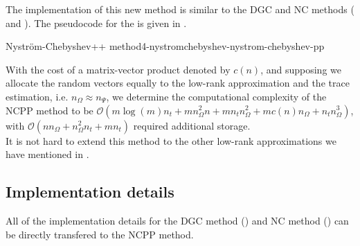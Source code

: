 The implementation of this new method is similar to the \gls{DGC} and \gls{NC} methods ( and ).
The pseudocode for the  is given in .

\begin{algo}{Nystr\"om-Chebyshev++ method}{4-nystromchebyshev-nystrom-chebyshev-pp}
    
\end{algo}

With the cost of a matrix-vector product denoted by
$c(n)$, and supposing we allocate the random vectors equally
to the low-rank approximation and the trace estimation, i.e. $n_{\Omega} \approx n_{\Psi}$,
we determine the computational complexity of the \gls{NCPP}
method to be $\mathcal{O}(m \log(m) n_t + m n_{\Omega}^2 n + m n_t n_{\Omega}^2 +  m c(n) n_{\Omega} + n_t n_{\Omega}^3)$, with
$\mathcal{O}(n n_{\Omega} + n_{\Omega}^2 n_t + m n_t)$ required additional storage.\\

It is not hard to extend this method to the other low-rank approximations
we have mentioned in .


\subsection{Implementation details}
\label{subsec:4-nystromchebyshev-implementation-details}

All of the implementation details for the \gls{DGC} method ()
and \gls{NC} method ()
can be directly transfered to the \gls{NCPP} method.\\

